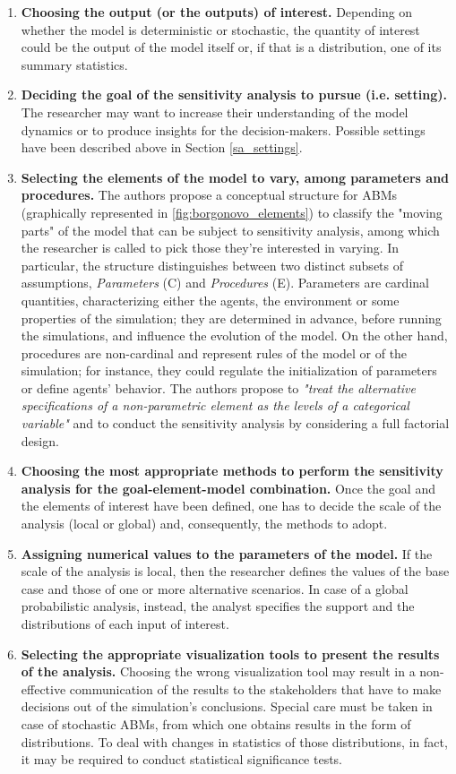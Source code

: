 \begin{enumerate}
    \item \textbf{Choosing the output (or the outputs) of interest.} Depending on whether the model is deterministic or stochastic, the quantity of interest could be the output of the model itself or, if that is a distribution, one of its summary statistics. 
    \item \textbf{Deciding the goal of the sensitivity analysis to pursue (i.e. setting).} The researcher may want to increase their understanding of the model dynamics or to produce insights for the decision-makers. Possible settings have been described above in Section \ref{sa_settings}.
    \item \textbf{Selecting the elements of the model to vary, among parameters and procedures.} The authors propose a conceptual structure for ABMs (graphically represented in \ref{fig:borgonovo_elements}) to classify the "moving parts" of the model that can be subject to sensitivity analysis, among which the researcher is called to pick those they're interested in varying. In particular, the structure distinguishes between two distinct subsets of assumptions, \textit{Parameters} (C) and \textit{Procedures} (E). Parameters are cardinal quantities, characterizing either the agents, the environment or some properties of the simulation; they are determined in advance, before running the simulations, and influence the evolution of the model. On the other hand, procedures are non-cardinal and represent rules of the model or of the simulation; for instance, they could regulate the initialization of parameters or define agents' behavior. The authors propose to \textit{"treat the alternative specifications of a non-parametric element as the levels of a categorical variable"} and to conduct the sensitivity analysis by considering a full factorial design. 
    \item \textbf{Choosing the most appropriate methods to perform the sensitivity analysis for the goal-element-model combination.} Once the goal and the elements of interest have been defined, one has to decide the scale of the analysis (local or global) and, consequently, the methods to adopt. 
    \item \textbf{Assigning numerical values to the parameters of the model.} If the scale of the analysis is local, then the researcher defines the values of the base case and those of one or more alternative scenarios. In case of a global probabilistic analysis, instead, the analyst specifies the support and the distributions of each input of interest.
    \item \textbf{Selecting the appropriate visualization tools to present the results of the analysis.} Choosing the wrong visualization tool may result in a non-effective communication of the results to the stakeholders that have to make decisions out of the simulation's conclusions. Special care must be taken in case of stochastic ABMs, from which one obtains results in the form of distributions. To deal with changes in statistics of those distributions, in fact, it may be required to conduct statistical significance tests.
\end{enumerate}


